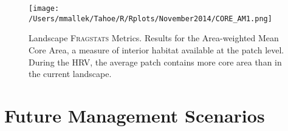\begin{figure}[!htbp]
  \centering
  \texttt{[image: /Users/mmallek/Tahoe/R/Rplots/November2014/CORE\_AM1.png]}
\caption{Landscape \textsc{Fragstats} Metrics. Results for the Area-weighted Mean Core Area, a measure of interior habitat available at the patch level. During the HRV, the average patch contains more core area than in the current landscape.} 
\label{fig:fragland_core}
\end{figure}


\section{Future Management Scenarios}